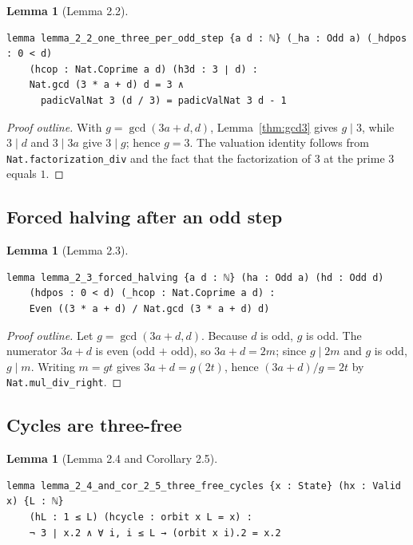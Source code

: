 \documentclass[11pt,a4paper]{article}
\newtheorem{lemma}[theorem]{Lemma}
\begin{document}
\begin{lemma}[Lemma 2.2]
\label{thm:one3}
\leavevmode\par\vspace{0.3em}
\begin{lstlisting}
lemma lemma_2_2_one_three_per_odd_step {a d : ℕ} (_ha : Odd a) (_hdpos : 0 < d)
    (hcop : Nat.Coprime a d) (h3d : 3 ∣ d) :
    Nat.gcd (3 * a + d) d = 3 ∧
      padicValNat 3 (d / 3) = padicValNat 3 d - 1
\end{lstlisting}
\end{lemma}

\begin{proof}[Proof outline]
With $g=\gcd(3a+d,d)$, Lemma~\ref{thm:gcd3} gives $g\mid 3$, while $3\mid d$
and $3\mid 3a$ give $3\mid g$; hence $g=3$.  The valuation identity follows from
\texttt{Nat.factorization\_div} and the fact that the factorization of $3$ at
the prime $3$ equals $1$.
\end{proof}

\subsection{Forced halving after an odd step}

\begin{lemma}[Lemma 2.3]
\label{thm:halving}
\leavevmode\par\vspace{0.3em}
\begin{lstlisting}
lemma lemma_2_3_forced_halving {a d : ℕ} (ha : Odd a) (hd : Odd d)
    (hdpos : 0 < d) (_hcop : Nat.Coprime a d) :
    Even ((3 * a + d) / Nat.gcd (3 * a + d) d)
\end{lstlisting}
\end{lemma}

\begin{proof}[Proof outline]
Let $g=\gcd(3a+d,d)$.  Because $d$ is odd, $g$ is odd.  The numerator $3a+d$ is
even (odd $+$ odd), so $3a+d=2m$; since $g\mid 2m$ and $g$ is odd, $g\mid m$.
Writing $m=gt$ gives $3a+d=g(2t)$, hence $(3a+d)/g=2t$ by
\texttt{Nat.mul\_div\_right}.
\end{proof}

\subsection{Cycles are three-free}

\begin{lemma}[Lemma 2.4 and Corollary 2.5]
\label{thm:cycles}
\leavevmode\par\vspace{0.3em}
\begin{lstlisting}
lemma lemma_2_4_and_cor_2_5_three_free_cycles {x : State} (hx : Valid x) {L : ℕ}
    (hL : 1 ≤ L) (hcycle : orbit x L = x) :
    ¬ 3 ∣ x.2 ∧ ∀ i, i ≤ L → (orbit x i).2 = x.2
\end{lstlisting}
\end{lemma}
\end{document}
